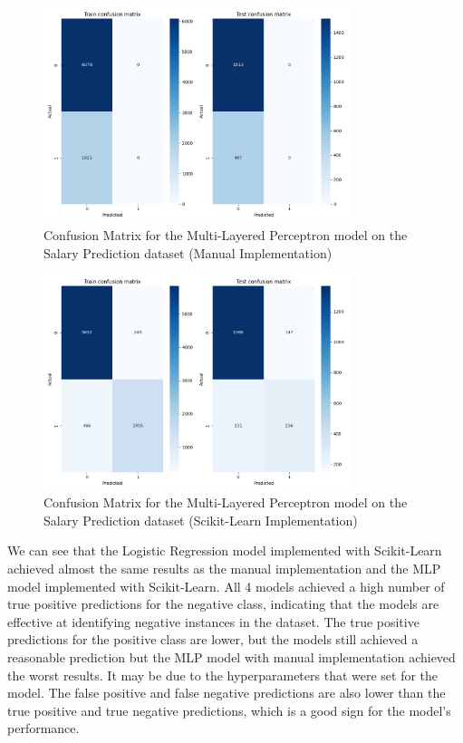 \documentclass[runningheads]{paper}
\begin{document}
\begin{figure}[H]
    \centering
    \includegraphics[width=0.8\textwidth]{../tema2_SalaryPrediction/MLP/confusion_matrix_manual.png}
    \caption{Confusion Matrix for the Multi-Layered Perceptron model on the Salary Prediction dataset (Manual Implementation)}
    \label{fig:confusion_matrix_mlp_manual_salary}
\end{figure}

\begin{figure}[H]
    \centering
    \includegraphics[width=0.8\textwidth]{../tema2_SalaryPrediction/MLP/confusion_matrix_scikit-learn.png}
    \caption{Confusion Matrix for the Multi-Layered Perceptron model on the Salary Prediction dataset (Scikit-Learn Implementation)}
    \label{fig:confusion_matrix_mlp_scikit_salary}
\end{figure}

We can see that the Logistic Regression model implemented with Scikit-Learn achieved
almost the same results as the manual implementation and the MLP model implemented
with Scikit-Learn. All 4 models achieved a high number of true positive predictions
for the negative class, indicating that the models are effective at identifying
negative instances in the dataset. The true positive predictions for the positive
class are lower, but the models still achieved a reasonable prediction but the
MLP model with manual implementation achieved the worst results. It may be due to
the hyperparameters that were set for the model. The false positive and false negative
predictions are also lower than the true positive and true negative predictions, which
is a good sign for the model's performance.
\end{document}
